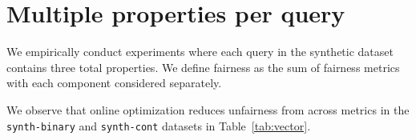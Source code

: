 \section{Multiple properties per query}
\label{sec:multiple_properties}

\begin{table}
\caption{Impact of fair ranking with a vector of query properties}\label{tab:vector}
\end{table}
We empirically conduct experiments where each query in the synthetic dataset contains three total properties. We define fairness as the sum of fairness metrics with each component considered separately. 


We observe that online optimization reduces unfairness from across metrics in the \texttt{synth-binary} and \texttt{synth-cont} datasets in Table~\ref{tab:vector}.

